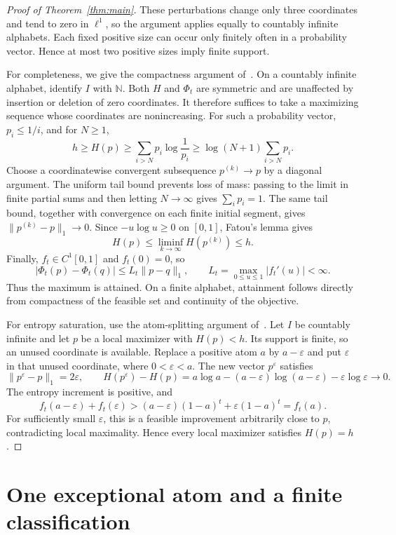 \documentclass[11pt]{article}
\numberwithin{equation}{section}
\begin{document}
\begin{proof}[Proof of Theorem~\ref{thm:main}]
These perturbations change only three coordinates and tend to zero in
$\ell^1$, so the argument applies equally to countably infinite alphabets.
Each fixed positive size can occur only finitely often in a probability
vector. Hence at most two positive sizes imply finite support.

For completeness, we give the compactness argument
of~\cite[Lemmas~1--2 and Theorem~2]{BKZ}. On a countably infinite alphabet,
identify $I$ with $\mathbb N$. Both $H$ and $\Phi_t$ are symmetric and are
unaffected by insertion or deletion of zero coordinates. It therefore
suffices to take a maximizing sequence whose coordinates are nonincreasing.
For such a probability vector, $p_i\le1/i$, and for $N\ge1$,
\[
 h\ge H(p)\ge\sum_{i>N}p_i\log\frac1{p_i}
 \ge\log(N+1)\sum_{i>N}p_i.
\]
Choose a coordinatewise convergent subsequence $p^{(k)}\to p$ by a diagonal
argument. The uniform tail bound prevents loss of mass: passing to the limit
in finite partial sums and then letting $N\to\infty$ gives
$\sum_i p_i=1$. The same tail bound, together with
convergence on each finite initial segment, gives
$\|p^{(k)}-p\|_1\to0$. Since $-u\log u\ge0$ on $[0,1]$, Fatou's lemma
gives
\[
 H(p)\le\liminf_{k\to\infty}H(p^{(k)})\le h.
\]
Finally, $f_t\in C^1[0,1]$ and $f_t(0)=0$, so
\[
 |\Phi_t(p)-\Phi_t(q)|\le L_t\|p-q\|_1,
 \qquad L_t=\max_{0\le u\le1}|f_t'(u)|<\infty.
\]
Thus the maximum is attained. On a finite alphabet, attainment follows
directly from compactness of the feasible set and continuity of the objective.

For entropy saturation, use the atom-splitting argument
of~\cite[Proposition~1]{BKZ}. Let $I$ be countably infinite and let $p$ be
a local maximizer with $H(p)<h$. Its support is finite, so an unused
coordinate is available. Replace a positive atom $a$ by $a-\varepsilon$
and put $\varepsilon$ in that unused coordinate, where $0<\varepsilon<a$.
The new vector $p^{\varepsilon}$ satisfies
\[
 \|p^{\varepsilon}-p\|_1=2\varepsilon,\qquad
 H(p^{\varepsilon})-H(p)
 =a\log a-(a-\varepsilon)\log(a-\varepsilon)
                -\varepsilon\log\varepsilon\longrightarrow0.
\]
The entropy increment is positive, and
\[
 f_t(a-\varepsilon)+f_t(\varepsilon)
 >(a-\varepsilon)(1-a)^t+\varepsilon(1-a)^t=f_t(a).
\]
For sufficiently small $\varepsilon$, this is a feasible improvement
arbitrarily close to $p$, contradicting local maximality. Hence every
local maximizer satisfies $H(p)=h$.
\end{proof}

\section{One exceptional atom and a finite classification}\label{sec:classification}
\end{document}
